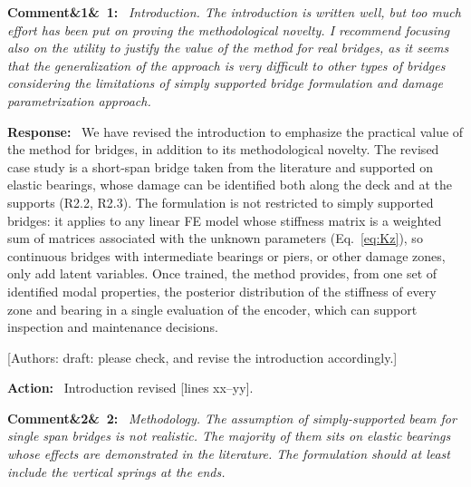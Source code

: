 \documentclass[11pt]{article}
\newenvironment{rcomment}[1]{\par\bigskip\noindent\textbf{Comment\ifx&#1&\else\ #1\fi:}\ \itshape}{\par}
\newenvironment{response}{\par\smallskip\noindent\color{resp}\textbf{Response:}\ }{\par}
\newenvironment{action}{\par\smallskip\noindent\color{resp}\textbf{Action:}\ }{\par}
\newcommand{\authornote}[1]{\textcolor{note}{\textsf{[Authors: #1]}}}
\newcommand{\tbd}[1]{\textcolor{note}{\textsf{[#1]}}}
\newcommand{\lines}[1]{\tbd{lines #1}}
\begin{document}
\begin{rcomment}{1}
Introduction. The introduction is written well, but too much effort has been put on proving the methodological novelty. I recommend focusing also on the utility to justify the value of the method for real bridges, as it seems that the generalization of the approach is very difficult to other types of bridges considering the limitations of simply
supported bridge formulation and damage parametrization approach.
\end{rcomment}

\begin{response}
We have revised the introduction to emphasize the practical value of the method for bridges, in addition to its
methodological novelty. The revised case study is a short-span bridge taken from the literature and supported on elastic
bearings, whose damage can be identified both along the deck and at the supports (R2.2, R2.3). The formulation is not
restricted to simply supported bridges: it applies to any linear FE model whose stiffness matrix is a weighted sum of
matrices associated with the unknown parameters (Eq.~\eqref{eq:Kz}), so continuous bridges with intermediate bearings or
piers, or other damage zones, only add latent variables. Once trained, the method provides, from one set of identified
modal properties, the posterior distribution of the stiffness of every zone and bearing in a single evaluation of the
encoder, which can support inspection and maintenance decisions.
\end{response}
\authornote{draft: please check, and revise the introduction accordingly.}

\begin{action}
Introduction revised \lines{xx--yy}.
\end{action}

\begin{rcomment}{2}
Methodology. The assumption of simply-supported beam for single span bridges is not realistic. 
The majority of them sits on elastic bearings whose effects are demonstrated in the literature. 
The formulation should at least include the vertical springs at the ends.
\end{rcomment}
\end{document}
